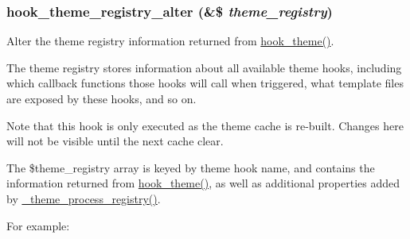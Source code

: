 \hypertarget{group__hooks_gadd6cabb9ce825efccefb4918321932a5}{
\subsubsection[{hook\_\-theme\_\-registry\_\-alter}]{\setlength{\rightskip}{0pt plus 5cm}hook\_\-theme\_\-registry\_\-alter (\&\$ {\em theme\_\-registry})}}
\label{group__hooks_gadd6cabb9ce825efccefb4918321932a5}
Alter the theme registry information returned from \hyperlink{group__hooks_ga013ccb45c7aaab1c16cf9691428c910d}{hook\_\-theme()}.

The theme registry stores information about all available theme hooks, including which callback functions those hooks will call when triggered, what template files are exposed by these hooks, and so on.

Note that this hook is only executed as the theme cache is re-\/built. Changes here will not be visible until the next cache clear.

The \$theme\_\-registry array is keyed by theme hook name, and contains the information returned from \hyperlink{group__hooks_ga013ccb45c7aaab1c16cf9691428c910d}{hook\_\-theme()}, as well as additional properties added by \hyperlink{includes_2theme_8inc_a473fae348447b091f0d8e677820d30c3}{\_\-theme\_\-process\_\-registry()}.

For example: 




